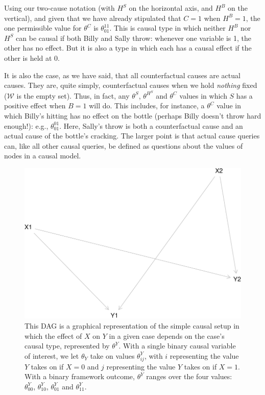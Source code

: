 \documentclass[12pt,]{book}
\begin{document}
Using our two-cause notation (with \(H^S\) on the horizontal axis, and \(H^B\) on the vertical), and given that we have already stipulated that \(C=1\) when \(H^B=1\), the one permissible value for \(\theta^C\) is \(\theta^{11}_{01}\). This is causal type in which neither \(H^B\) nor \(H^S\) can be causal if both Billy and Sally throw: whenever one variable is 1, the other has no effect. But it is also a type in which each has a causal effect if the other is held at 0.

It is also the case, as we have said, that all counterfactual causes are actual causes. They are, quite simply, counterfactual causes when we hold \emph{nothing} fixed (\(\mathcal W\) is the empty set). Thus, in fact, any \(\theta^S\), \(\theta^{H^S}\) and \(\theta^C\) values in which \(S\) has a positive effect when \(B=1\) will do. This includes, for instance, a \(\theta^C\) value in which Billy's hitting has no effect on the bottle (perhaps Billy doesn't throw hard enough!): e.g., \(\theta^{01}_{01}\). Here, Sally's throw is both a counterfactual cause and an actual cause of the bottle's cracking. The larger point is that actual cause queries can, like all other causal queries, be defined as questions about the values of nodes in a causal model.

\begin{figure}

{\centering \includegraphics[width=.5\textwidth]{ii_files/figure-latex/unnamed-chunk-16-1} 

}

\caption{\label{fig:actualquery} This DAG is a graphical representation of the simple causal setup in which the effect of $X$ on $Y$ in a given case depends on the case's causal type, represented by $\theta^Y$. With a single binary causal variable of interest, we let $\theta_Y$ take on values $\theta^Y_{ij}$, with $i$ representing the value $Y$ takes on if $X=0$ and $j$ representing the value $Y$ takes on if $X=1$. With a binary framework outcome, $\theta^Y$ ranges over the four values: $\theta^Y_{00}$, $\theta^Y_{10}$, $\theta^Y_{01}$ and $\theta^Y_{11}$.}\label{fig:unnamed-chunk-16}
\end{figure}
\end{document}
